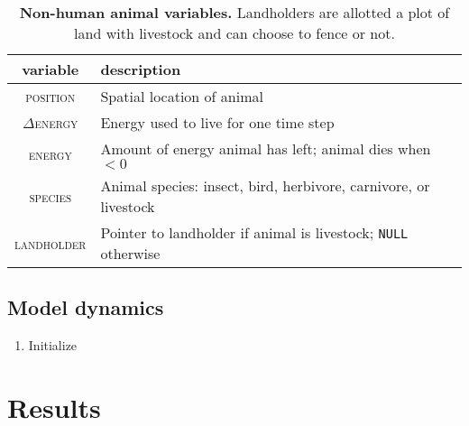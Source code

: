 \documentclass{article}
\theoremstyle{mytheorem}
\theoremstyle{myremark}
\begin{document}
\begin{table}[h]
  \caption{\textbf{Non-human animal variables.} Landholders are allotted a plot of
  land with livestock and can choose to fence or not.}
  \label{tab:landholders}
  \begin{tabular}{cl} \toprule
    variable & description \\ \midrule  
    \textsc{position} & Spatial location of animal \\
    $\Delta$\textsc{energy} & Energy used to live for one time step \\
    \textsc{energy} & Amount of energy animal has left; animal dies when $<0$ \\
    \textsc{species} & Animal species: insect, bird, herbivore, carnivore, or
    livestock \\
    \textsc{landholder} & Pointer to landholder if animal is livestock; \texttt{NULL}
    otherwise \\
    \bottomrule
  \end{tabular} 
\end{table}

\subsection{Model dynamics}

\begin{enumerate}
  \item 
    Initialize 
\end{enumerate}


\section{Results}

\printbibliography
\end{document}
